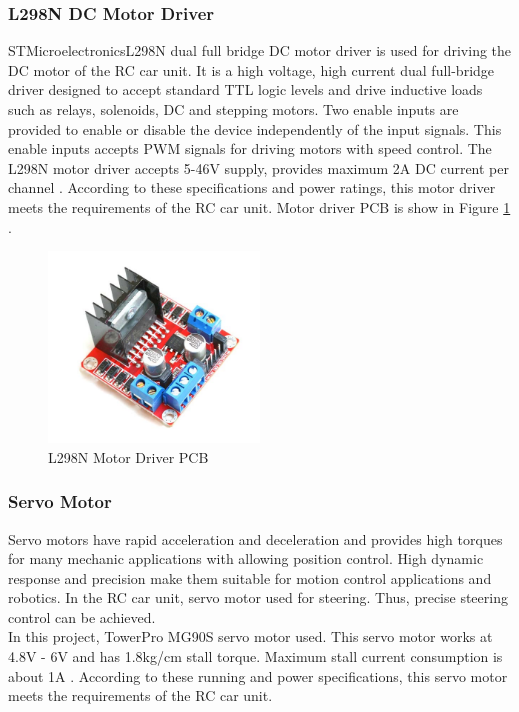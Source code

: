 \subsubsection{L298N DC Motor Driver}
STMicroelectronics\texttrademark\;L298N dual full bridge DC motor driver is used for driving the DC motor of the RC car unit. It is a high voltage, high current dual full-bridge driver designed to accept standard TTL logic levels and drive inductive loads such as relays, solenoids, DC and stepping motors. Two enable inputs are provided to enable or disable the device independently of the input signals. This enable inputs accepts PWM signals for driving motors with speed control. The L298N motor driver accepts 5-46V supply, provides maximum 2A DC current per channel \cite{Two}. According to these specifications and power ratings, this motor driver meets the requirements of the RC car unit. Motor driver PCB is show in Figure \ref{fig:l298n_pcb} .

\begin{figure}[!htbp]
    \centering
    \includegraphics[width=0.5\textwidth]{Imgs/l298n.png}
    \caption{\label{fig:l298n_pcb}L298N Motor Driver PCB}
\end{figure}

\subsubsection{Servo Motor}
Servo motors have rapid acceleration and deceleration and provides high torques for many mechanic applications with allowing position control. High dynamic response and precision make them suitable for motion control applications and robotics. In the RC car unit, servo motor used for steering. Thus, precise steering control can be achieved.\\

In this project, TowerPro\texttrademark\; MG90S servo motor used. This servo motor works at 4.8V - 6V and has 1.8kg/cm stall torque. Maximum stall current consumption is about 1A \cite{Ref_servo_mg90s}. According to these running and power specifications, this servo motor meets the requirements of the RC car unit.


